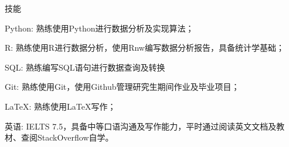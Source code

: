 \documentclass{resume} %
\begin{document}
\begin{rSection}{技能}

\begin{rSubsection}{}{}{}{}
\item {Python:} 熟练使用Python进行数据分析及实现算法；
\item {R:} 熟练使用R进行数据分析，使用Rnw编写数据分析报告，具备统计学基础；
\item {SQL:} 熟练编写SQL语句进行数据查询及转换
\item {Git:} 熟练使用Git，使用Github管理研究生期间作业及毕业项目；
\item {\LaTeX:} 熟练使用\LaTeX{}写作；
\item{英语:} IELTS 7.5，具备中等口语沟通及写作能力，平时通过阅读英文文档及教材、查阅StackOverflow自学。
\end{rSubsection}

\end{rSection}



\end{document}
